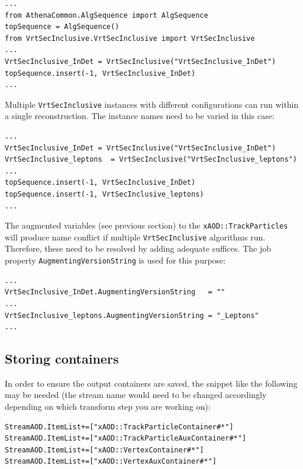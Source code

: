 \documentclass[NOTE, atlasdraft=true, texlive=2018, UKenglish]{\ATLASLATEXPATH atlasdoc}
\begin{document}
\begin{scriptsize}
\begin{verbatim}
...
from AthenaCommon.AlgSequence import AlgSequence
topSequence = AlgSequence()
from VrtSecInclusive.VrtSecInclusive import VrtSecInclusive
...
VrtSecInclusive_InDet = VrtSecInclusive("VrtSecInclusive_InDet")
topSequence.insert(-1, VrtSecInclusive_InDet)
...
\end{verbatim}
\end{scriptsize}

Multiple {\tt VrtSecInclusive} instances with different configurations can run within a single reconstruction. The instance names need to be varied in this case:

\begin{scriptsize}
\begin{verbatim}
...
VrtSecInclusive_InDet = VrtSecInclusive("VrtSecInclusive_InDet")
VrtSecInclusive_leptons  = VrtSecInclusive("VrtSecInclusive_leptons")
...
topSequence.insert(-1, VrtSecInclusive_InDet)
topSequence.insert(-1, VrtSecInclusive_leptons)
...
\end{verbatim}
\end{scriptsize}

The augmented variables (see previous section) to the {\tt xAOD::TrackParticles} will produce name conflict if multiple {\tt VrtSecInclusive} algorithms run. Therefore, these need to be resolved by adding adequate suffices. The job property {\tt AugmentingVersionString} is used for this purpose:

\begin{scriptsize}
\begin{verbatim}
...
VrtSecInclusive_InDet.AugmentingVersionString   = ""
...
VrtSecInclusive_leptons.AugmentingVersionString = "_Leptons"
...
\end{verbatim}
\end{scriptsize}

\subsection{Storing containers}
In order to ensure the output containers are saved, the snippet like the following may be needed (the stream name would need to be changed accordingly depending on which transform step you are working on):
\begin{scriptsize}
\begin{verbatim}
StreamAOD.ItemList+=["xAOD::TrackParticleContainer#*"]
StreamAOD.ItemList+=["xAOD::TrackParticleAuxContainer#*"]
StreamAOD.ItemList+=["xAOD::VertexContainer#*"]
StreamAOD.ItemList+=["xAOD::VertexAuxContainer#*"]
\end{verbatim}
\end{scriptsize}
\end{document}

